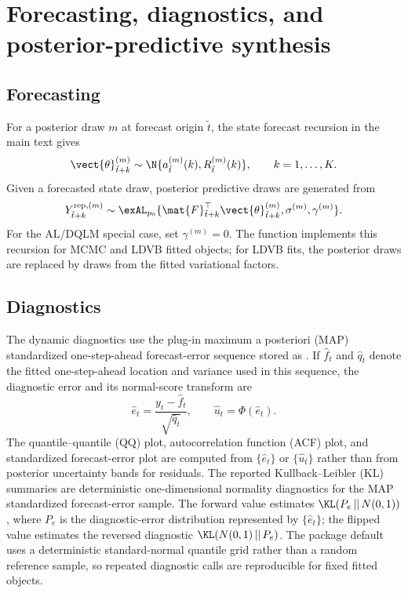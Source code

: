 \section{Forecasting, diagnostics, and posterior-predictive synthesis}
\label{sec:forecast_diagnostics_synthesis}

\subsection{Forecasting}

For a posterior draw $m$ at forecast origin $\tilde t$, the state forecast
recursion in the main text gives
\begin{equation}
\vect{\theta}_{\tilde t+k}^{(m)}
\sim
\N\{a_{\tilde t}^{(m)}(k),R_{\tilde t}^{(m)}(k)\},
\qquad k=1,\ldots,K.
\end{equation}
Given a forecasted state draw, posterior predictive draws are generated from
\begin{equation}
Y_{\tilde t+k}^{\mathrm{rep},(m)}
\sim
\exAL_{p_0}\{
\mat{F}_{\tilde t+k}^\top\vect{\theta}_{\tilde t+k}^{(m)},
\sigma^{(m)},\gamma^{(m)}
\}.
\label{eq:forecast_postpred}
\end{equation}
For the AL/DQLM special case, set $\gamma^{(m)}=0$. The function
 implements this recursion for MCMC and LDVB fitted
objects; for LDVB fits, the posterior draws are replaced by draws from the
fitted variational factors.

\subsection{Diagnostics}

The dynamic diagnostics use the plug-in maximum a posteriori (MAP) standardized one-step-ahead
forecast-error sequence stored as . If
$\widehat f_t$ and $\widehat q_t$ denote the fitted one-step-ahead location and
variance used in this sequence, the diagnostic error and its normal-score
transform are
\begin{equation}
\widehat e_t = \frac{y_t-\widehat f_t}{\sqrt{\widehat q_t}},
\qquad
\widehat u_t = \Phi(\widehat e_t).
\label{eq:pit_plugin}
\end{equation}
The quantile--quantile (QQ) plot, autocorrelation function (ACF) plot, and standardized forecast-error plot are computed from
$\{\widehat e_t\}$ or $\{\widehat u_t\}$ rather than from posterior uncertainty
bands for residuals. The reported Kullback--Leibler (KL) summaries are deterministic
one-dimensional normality diagnostics for the MAP standardized forecast-error
sample. The forward value estimates \(\KL(P_e\,||\,N(0,1))\), where \(P_e\) is the
diagnostic-error distribution represented by \(\{\widehat e_t\}\); the flipped
value estimates the reversed diagnostic \(\KL(N(0,1)\,||\,P_e)\). The package
default uses a deterministic standard-normal quantile grid rather than a random
reference sample, so repeated diagnostic calls are reproducible for fixed fitted
objects.


